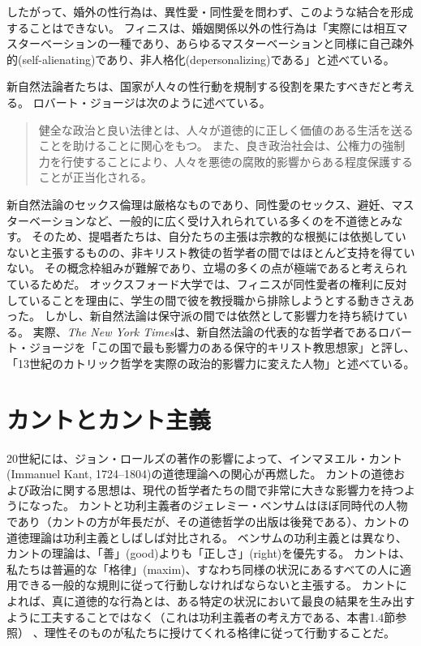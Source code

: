\documentclass[paper=a4,book,openany]{jlreq}
\begin{document}
したがって、婚外の性行為は、異性愛・同性愛を問わず、このような結合を形成することはできない。
フィニスは、婚姻関係以外の性行為は「実際には相互マスターベーションの一種であり、あらゆるマスターベーションと同様に自己疎外的(self-alienating)であり、非人格化(depersonalizing)である」と述べている\citep[p.1066]{finnis94:_law_moral_sexual_orien}。

新自然法論者たちは、国家が人々の性行動を規制する役割を果たすべきだと考える。
ロバート・ジョージは次のように述べている。

\begin{quote}
健全な政治と良い法律とは、人々が道徳的に正しく価値のある生活を送ることを助けることに関心をもつ。
また、良き政治社会は、公権力の強制力を行使することにより、人々を悪徳の腐敗的影響からある程度保護することが正当化される。
\citep[p.20]{george93:_makin_men_moral}
\end{quote}

新自然法論のセックス倫理は厳格なものであり、同性愛のセックス、避妊、マスターベーションなど、一般的に広く受け入れられている多くのを不道徳とみなす。
そのため、提唱者たちは、自分たちの主張は宗教的な根拠には依拠していないと主張するものの、非キリスト教徒の哲学者の間ではほとんど支持を得ていない。
その概念枠組みが難解であり、立場の多くの点が極端であると考えられているためだ。
オックスフォード大学では、フィニスが同性愛者の権利に反対していることを理由に、学生の間で彼を教授職から排除しようとする動きさえあった\citep{benn19:_we_dont_think_john_finnis}。
しかし、新自然法論は保守派の間では依然として影響力を持ち続けている。
実際、\emph{The New York Times}は、新自然法論の代表的な哲学者であるロバート・ジョージを「この国で最も影響力のある保守的キリスト教思想家」と評し、「13世紀のカトリック哲学を実際の政治的影響力に変えた人物」と述べている\citep{kirkpatrick09:_conser_chris_big_think}。

\section{カントとカント主義}

20世紀には、ジョン・ロールズの著作の影響によって、インマヌエル・カント(Immanuel Kant, 1724--1804)の道徳理論への関心が再燃した。
カントの道徳および政治に関する思想は、現代の哲学者たちの間で非常に大きな影響力を持つようになった。
カントと功利主義者のジェレミー・ベンサムはほぼ同時代の人物であり（カントの方が年長だが、その道徳哲学の出版は後発である）、カントの道徳理論は功利主義としばしば対比される。
ベンサムの功利主義とは異なり、カントの理論は、「善」(good)よりも「正しさ」(right)を優先する。
カントは、私たちは普遍的な「格律」(maxim)、すなわち同様の状況にあるすべての人に適用できる一般的な規則に従って行動しなければならないと主張する。
カントによれば、真に道徳的な行為とは、ある特定の状況において最良の結果を生み出すように工夫することではなく（これは功利主義者の考え方である、本書1.4節参照） 、理性そのものが私たちに授けてくれる格律に従って行動することだ。
\end{document}
